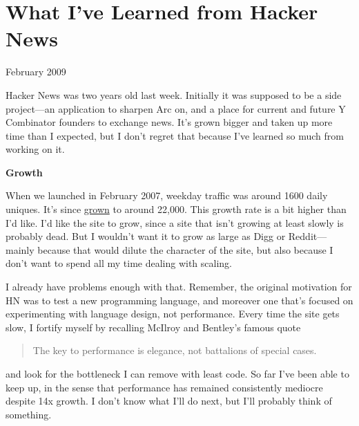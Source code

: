 \chapter{What I've Learned from Hacker News}


            
              
                

February 2009

Hacker News was two years old last
                  week. Initially it was supposed to be a side project---an
                  application to sharpen Arc on, and a place for current and
                  future Y Combinator founders to exchange news. It's grown
                  bigger and taken up more time than I expected, but I don't
                  regret that because I've learned so much from working on
                  it.

\textbf{Growth}

When we launched in
                  February 2007, weekday traffic was around 1600 daily uniques.
                  It's since
                  \href{http://ycombinator.com/images/2yeartraffic.png}{grown}
                  to around 22,000. This growth rate is a bit higher than I'd
                  like. I'd like the site to grow, since a site that isn't
                  growing at least slowly is probably dead. But I wouldn't want
                  it to grow as large as Digg or Reddit---mainly because
                  that would dilute the character of the site, but also because
                  I don't want to spend all my time dealing with scaling.

I
                  already have problems enough with that. Remember, the original
                  motivation for HN was to test a new programming language, and
                  moreover one that's focused on experimenting with language
                  design, not performance. Every time the site gets slow, I
                  fortify myself by recalling McIlroy and Bentley's famous quote
                  \begin{quote}

                    The key to performance is elegance, not battalions of
                    special cases.
                  
\end{quote}

                  and look for the bottleneck I can remove with least code. So
                  far I've been able to keep up, in the sense that performance
                  has remained consistently mediocre despite 14x growth. I don't
                  know what I'll do next, but I'll probably think of
                  something.

